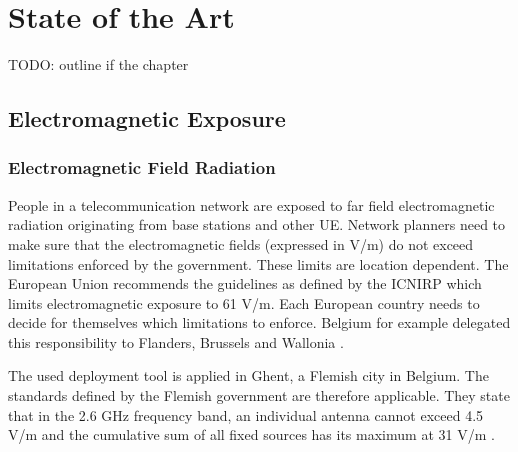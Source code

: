 \chapter{State of the Art}
\label{chap:stateoftheart}
TODO: outline if the chapter


\section{Electromagnetic Exposure}

\subsection{Electromagnetic Field Radiation} %
\label{sub:emf}
People in a telecommunication network are exposed to far field electromagnetic radiation originating from base stations and other \gls{UE}. 
Network planners need to make sure that the electromagnetic fields (expressed in V/m) do not exceed limitations enforced 
by the government. These limits are location dependent. The European Union recommends the guidelines as defined by the \gls{ICNIRP} which limits electromagnetic exposure to 61 V/m.
Each European country needs to decide for themselves which limitations to enforce. Belgium for example delegated this responsibility to Flanders, Brussels and Wallonia \cite{J23}.

The used deployment tool is applied in Ghent, a Flemish city in Belgium. The standards defined by the Flemish government are therefore applicable.
They state that in the 2.6 GHz frequency band, an individual antenna cannot exceed 4.5 V/m and the cumulative sum of all fixed sources has its maximum at 31 V/m \cite{J23, S13_normenBelgie}.

